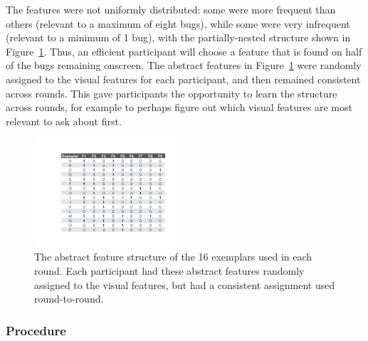 \documentclass[10pt,letterpaper]{article}
\begin{document}
The features were not uniformly distributed: some were more frequent than others (relevant to a maximum of eight bugs), while some were very infrequent (relevant to a minimum of 1 bug), with the partially-nested structure shown in Figure~\ref{fig:feature_table}. Thus, an efficient participant will choose a feature that is found on half of the bugs remaining onscreen. The abstract features in Figure~\ref{fig:feature_table} were randomly assigned to the visual features for each participant, and then remained consistent across rounds. This gave participants the opportunity to learn the structure across rounds, for example to perhaps figure out which visual features are most relevant to ask about first.

\begin{figure}[!h]
  \centering
  \includegraphics[width=0.48\textwidth]{figures/feature_table}
  \caption{The abstract feature structure of the 16 exemplars used in each round. Each participant had these abstract features randomly assigned to the visual features, but had a consistent assignment used round-to-round.}
  \label{fig:feature_table}
\end{figure} 

\subsubsection{Procedure}
\end{document}
